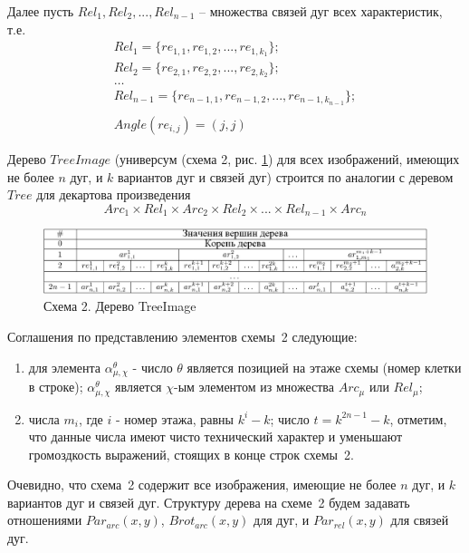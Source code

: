 Далее пусть $Rel_1, Rel_2, ..., Rel_{n-1}$ – множества связей дуг всех характеристик, т.е. 
\begin{equation}
\begin{array}{c}
Rel_1 = \{re_{1,1}, re_{1,2}, ..., re_{1,k_1}\}; \\
Rel_2 = \{ re_{2,1}, re_{2,2}, ..., re_{2,k_2}\}; \\
\dots \\
Rel_{n-1} = \{ re_{{n-1},1}, re_{{n-1},2}, ..., re_{{n-1},k_{n-1}}\}; \\
\\
Angle(re_{i,j})=(j,j)
\end{array}
\end{equation}

Дерево $TreeImage$ (универсум (схема 2, рис. \ref{tree_image}) для всех изображений, имеющих не более $n$ дуг, и $k$ вариантов дуг и связей дуг) строится по аналогии с деревом $Tree$ для декартова произведения
$$Arc_1 \times Rel_1 \times Arc_2 \times Rel_2 \times ... \times Rel_{n-1} \times Arc_n $$

\begin{figure}[b]
\includegraphics[width=\linewidth,keepaspectratio]{images/an_tbl2}
\caption{Схема 2. Дерево TreeImage}
\label{tree_image}
\end{figure}

Соглашения по представлению элементов схемы~2 следующие:
\begin{enumerate}
\item для элемента $\alpha_{\mu,\chi}^\theta$ - число $\theta$ является позицией на этаже схемы (номер клетки в строке); $\alpha_{\mu,\chi}^\theta$ является $\chi$-ым элементом из множества $Arc_{\mu}$ или $Rel_{\mu}$;
\item числа $m_i$, где $i$ - номер этажа, равны $k^i - k$; число $t = k^{2n-1}-k$, отметим, что данные числа имеют чисто технический характер и уменьшают громоздкость выражений, стоящих в конце строк схемы~2.
\end{enumerate}

Очевидно, что схема~2 содержит все изображения, имеющие не более $n$ дуг, и $k$ 
вариантов дуг и связей дуг. 
Структуру дерева на схеме~2 будем задавать отношениями 
$Par_{arc}(x,y)$, $Brot_{arc}(x,y)$ для дуг, и $Par_{rel}(x,y)$ для связей дуг.

